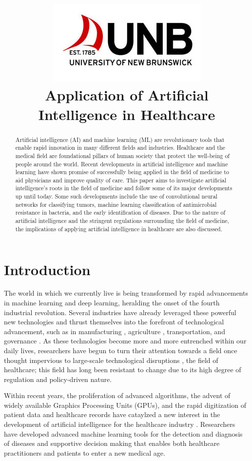\documentclass[a4paper]{article}
\title{\includegraphics[scale=0.75]{Resources/unblogo.jpg}\\Application of Artificial Intelligence in Healthcare}
\begin{document}
\maketitle

\begin{abstract}
    Artificial intelligence (AI) and machine learning (ML) are revolutionary tools that enable rapid innovation in many different fields and industries. Healthcare and the medical field are foundational pillars of human society that protect the well-being of people around the world. Recent developments in artificial intelligence and machine learning have shown promise of successfully being applied in the field of medicine to aid physicians and improve quality of care. This paper aims to investigate artificial intelligence's roots in the field of medicine and follow some of its major developments up until today. Some such developments include the use of convolutional neural networks for classifying tumors, machine learning classification of antimicrobial resistance in bacteria, and the early identification of diseases. Due to the nature of artificial intelligence and the stringent regulations surrounding the field of medicine, the implications of applying artificial intelligence in healthcare are also discussed.   
\end{abstract}

\newpage

\section{Introduction}

The world in which we currently live is being transformed by rapid advancements in machine learning and deep learning, heralding the onset of the fourth industrial revolution. Several industries have already leveraged these powerful new technologies and thrust themselves into the forefront of technological advancement, such as in manufacturing \cite{mohd_2022}, agriculture \cite{rashid_2024}, transportation, and governance \cite{qayyum_2021}. As these technologies become more and more entrenched within our daily lives, researchers have begun to turn their attention towards a field once thought impervious to large-scale technological disruptions \cite{qayyum_2021, latif_2017}, the field of healthcare; this field has long been resistant to change due to its high degree of regulation and policy-driven nature.

Within recent years, the proliferation of advanced algorithms, the advent of widely available Graphics Processing Units (GPUs), and the rapid digitization of patient data and healthcare records have cataylzed a new interest in the development of artificial intelligence for the healthcare industry \cite{jones_2018}. Researchers have developed advanced machine learning tools for the detection and diagnosis of diseases and supportive decision making that enables both healthcare practitioners and patients to enter a new medical age. \
\end{document}

